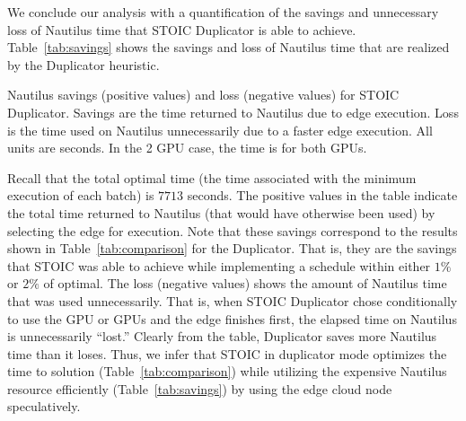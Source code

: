We conclude our analysis with a quantification of the savings and unnecessary loss of Nautilus time that STOIC Duplicator is able to achieve. Table~\ref{tab:savings} shows the savings and loss of Nautilus time that are
realized by the Duplicator heuristic.

%
%

\begin{table}[t] 
\centering

\caption{
Nautilus savings (positive values) and loss (negative values) for STOIC Duplicator. Savings are the time returned to Nautilus due to edge execution. Loss is the time used on Nautilus unnecessarily due to a faster edge execution. All units are seconds. In the 2 GPU case, the time is for both GPUs.}
\label{tab:savings}
\end{table}

Recall that the total optimal time (the time associated with the minimum execution of each batch) is $7713$ seconds. The positive values in the table indicate the total time returned to Nautilus (that would have otherwise been used) by selecting the edge for execution.  Note that these savings correspond to the results shown in Table~\ref{tab:comparison} for the Duplicator. That is, they are the savings that STOIC was able to achieve while implementing a schedule within either $1\%$ or $2\%$ of optimal.  The loss (negative values) shows the amount of Nautilus time that was used unnecessarily. That is, when STOIC Duplicator chose conditionally to use the GPU or GPUs and the edge finishes first, the elapsed time on Nautilus is unnecessarily ``lost.'' Clearly from the table, Duplicator saves more Nautilus time than it loses. Thus, we infer that STOIC in duplicator mode optimizes the time to solution (Table~\ref{tab:comparison}) while utilizing the expensive Nautilus resource efficiently (Table~\ref{tab:savings}) by using the edge cloud node speculatively.  


